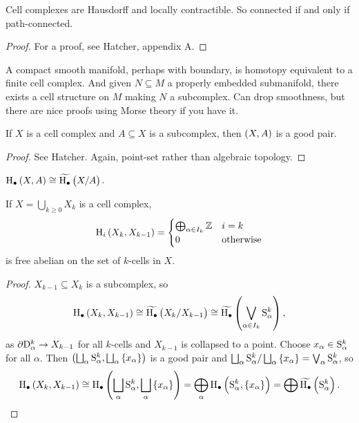 \begin{proposition}
Cell complexes are Hausdorff and locally contractible. So connected if and only if path-connected.
\end{proposition}

\begin{proof}
For a proof, see Hatcher, appendix A.
\end{proof}

\begin{fact*}
A compact smooth manifold, perhaps with boundary, is homotopy equivalent to a finite cell complex. And given $ N \subseteq M $ a properly embedded submanifold, there exists a cell structure on $ M $ making $ N $ a subcomplex. Can drop smoothness, but there are nice proofs using Morse theory if you have it.
\end{fact*}

\begin{lemma}
If $ X $ is a cell complex and $ A \subseteq X $ is a subcomplex, then $ \br{X, A} $ is a good pair.
\end{lemma}

\begin{proof}
See Hatcher. Again, point-set rather than algebraic topology.
\end{proof}

\begin{corollary}
$ \H_\bullet\br{X, A} \cong \widetilde{\H_\bullet}\br{X / A} $.
\end{corollary}

\begin{corollary}
If $ X = \bigcup_{k \ge 0} X_k $ is a cell complex,
$$ \H_i\br{X_k, X_{k - 1}} =
\begin{cases}
\bigoplus_{\alpha \in I_k} \ZZ & i = k \\
0 & \text{otherwise}
\end{cases}
$$
is free abelian on the set of $ k $-cells in $ X $.
\end{corollary}

\begin{proof}
$ X_{k - 1} \subseteq X_k $ is a subcomplex, so
$$ \H_\bullet\br{X_k, X_{k - 1}} \cong \widetilde{\H_\bullet}\br{X_k / X_{k - 1}} \cong \widetilde{\H_\bullet}\br{\bigvee_{\alpha \in I_k} \S_\alpha^k}, $$
as $ \da\D_\alpha^k \to X_{k - 1} $ for all $ k $-cells and $ X_{k - 1} $ is collapsed to a point. Choose $ x_\alpha \in \S_\alpha^k $ for all $ \alpha $. Then $ \br{\bigsqcup_\alpha \S_\alpha^k, \bigsqcup_\alpha \cbr{x_\alpha}} $ is a good pair and $ \bigsqcup_\alpha \S_\alpha^k / \bigsqcup_\alpha \cbr{x_\alpha} = \bigvee_\alpha \S_\alpha^k $, so
$$ \H_\bullet\br{X_k, X_{k - 1}} \cong \H_\bullet\br{\bigsqcup_\alpha \S_\alpha^k, \bigsqcup_\alpha \cbr{x_\alpha}} = \bigoplus_\alpha \H_\bullet\br{\S_\alpha^k, \cbr{x_\alpha}} = \bigoplus \widetilde{\H_\bullet}\br{\S_\alpha^k}. $$
\end{proof}

